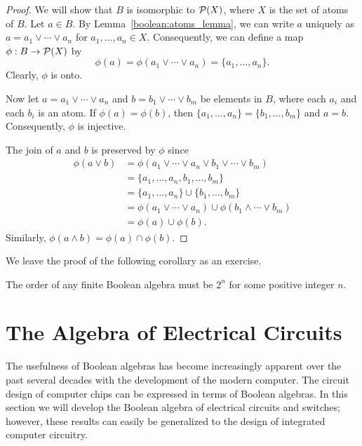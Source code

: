  
\begin{proof} 
We will show that $B$ is isomorphic to ${\cal P}(X)$, where $X$ is the
set of atoms of $B$. Let $a \in B$. By Lemma~\ref{boolean:atoms_lemma}, we can write $a$
uniquely as $a = a_1 \vee \cdots \vee a_n$ for $a_1, \ldots, a_n \in
X$. Consequently, we can define a  map $\phi : B \rightarrow {\cal
P}(X)$ by  
\[
\phi(a) = \phi(  a_1 \vee \cdots \vee a_n ) = \{a_1, \ldots, a_n \}.
\]
Clearly, $\phi$ is onto.
 
 
Now let $a = a_1 \vee \cdots \vee a_n$ and $b = b_1 \vee \cdots
\vee b_m$ be elements in $B$, where each $a_i$ and each $b_i$ is an
atom. If $\phi(a) = \phi(b)$, then $\{a_1, \ldots, a_n \} = \{b_1,
\ldots, b_m \}$ and $a = b$. Consequently, $\phi$ is injective.
 
 
The join of $a$ and $b$ is preserved by $\phi$ since
\begin{align*}
\phi(a \vee b) & = \phi( a_1 \vee \cdots \vee a_n \vee b_1 \vee
\cdots \vee b_m ) \\
& = \{ a_1, \ldots, a_n, b_1, \ldots, b_m \} \\
& = \{ a_1, \ldots, a_n \} \cup \{ b_1, \ldots, b_m \} \\
& = \phi( a_1 \vee \cdots \vee a_n ) \cup \phi( b_1 \wedge \cdots
\vee b_m ) \\ 
& = \phi(a) \cup \phi(b).
\end{align*}
Similarly, $\phi( a \wedge b ) = \phi(a) \cap \phi(b)$.
\end{proof}
 
 
\medskip
 
 
We leave the proof of the following corollary as an exercise.
 
 
\begin{corollary}
The order of any finite Boolean algebra must be $2^n$ for some
positive integer $n$.
\end{corollary}
 
 
 
\section{The Algebra of Electrical Circuits}
 
 
The usefulness of Boolean algebras has become increasingly apparent
over the past several decades with the development of the modern
computer. The circuit design of computer chips can be expressed in
terms of Boolean algebras. In this section we will develop the Boolean
algebra of electrical circuits and switches; however, these results
can easily be generalized to the design of integrated computer
circuitry.  
 
